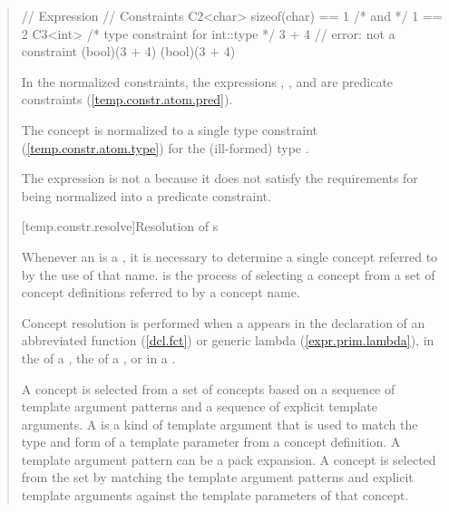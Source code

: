 \begin{quote}
\begin{codeblock}
// Expression      // Constraints
C2<char>           sizeof(char) == 1 /* and */ 1 == 2
C3<int>            /* type constraint for int::type */
3 + 4              // error: not a constraint
(bool)(3 + 4)      (bool)(3 + 4)
\end{codeblock}
In the normalized constraints, the expressions , 
, and  are predicate 
constraints (\ref{temp.constr.atom.pred}). 

The concept  is normalized to a single type constraint
(\ref{temp.constr.atom.type}) for the (ill-formed) 
type .

The expression  is not a 
 because it does
not satisfy the requirements for being normalized into a predicate 
constraint.
\exitexample


[temp.constr.resolve]{Resolution of s}

\pnum
Whenever an  is a , it is 
necessary to determine a single concept referred to by the use of that name.
% 
 is the process of selecting a concept 
from a set of concept definitions referred to by a concept name.

Concept resolution is performed when a 
 appears in
the declaration of an abbreviated function (\ref{dcl.fct})
or generic lambda (\ref{expr.prim.lambda}),
in the  of a
, the
 of a
, or
in a .

\pnum
A concept is selected from a set of concepts based on a sequence
of template argument patterns and a sequence of explicit
template arguments. 
% 
A  is a kind of template argument 
that is used to match the type and form of a template parameter from a 
concept definition. A template argument pattern can be a pack expansion.
% 
A concept is selected from the set by matching the template
argument patterns and explicit template arguments against the template 
parameters of that concept.


\end{quote}
